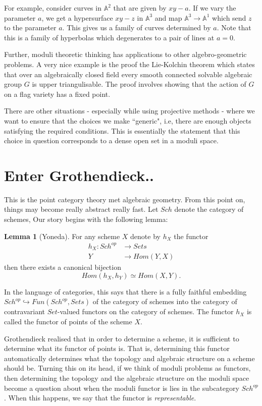 \documentclass[11pt]{amsart}
\newcommand{\A}{{\mathbb A}}
\theoremstyle{definition}
\newtheorem{lemma}[theorem]{Lemma}
\begin{document}
For example, consider curves in $\A^2$ that are given by $xy - a$. If we vary the parameter $a$, we get a hypersurface $xy-z$ in $\A^3$ and map $\A^3\rightarrow\A^1$ which send $z$ to the parameter $a$. This gives us a family of curves determined by $a$. Note that this is a family of hyperbolas which degenerates to a pair of lines at $a=0$.

Further, moduli theoretic thinking has applications to other algebro-geometric problems. A very nice example is the proof the Lie-Kolchin theorem which states that over an algebraically closed field every smooth connected solvable algebraic group $G$ is upper triangulisable. The proof involves showing that the action of $G$ on a flag variety has a fixed point.

There are other situations - especially while using projective methods - where we want to ensure that the choices we make ``generic", i.e, there are enough objects satisfying the required conditions. This is essentially the statement that this choice in question corresponds to a dense open set in a moduli space.


\section{Enter Grothendieck..}

This is the point category theory met algebraic geometry. From this point on, things may become really abstract really fast. Let $Sch$ denote the category of schemes, Our story begins with the following lemma:
\begin{lemma}[Yoneda]
	For any scheme $X$ denote by $h_X$ the functor
	\begin{align*}
	h_X : Sch^{op} &\rightarrow Sets\\
	Y&\rightarrow Hom(Y,X)
	\end{align*}
	then there exists a canonical bijection
	\[Hom(h_X,h_Y)\simeq Hom(X,Y).\]
\end{lemma}

In the language of categories, this says that there is a fully faithful embedding $Sch^{op}\hookrightarrow Fun(Sch^{op},Sets)$ of the category of schemes into the category of contravariant $Set$-valued functors on the category of schemes. The functor $h_X$ is called the functor of points of the scheme $X$.

Grothendieck realised that in order to determine a scheme, it is sufficient to determine what its functor of points is. That is, determining this functor automatically determines what the topology and algebraic structure on a scheme should be. Turning this on its head, if we think of moduli problems as functors, then determining the topology and the algebraic structure on the moduli space become a question about when the moduli functor is lies in the subcategory $Sch^{op}$. When this happens, we say that the functor is \textit{representable}.
\end{document}
